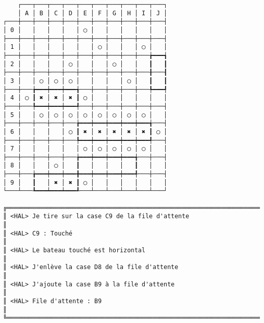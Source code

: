 {\scriptsize
\begin{verbatim}
    ┌───┬───┬───┬───┬───┬───┬───┬───┬───┬───┐
    │ A │ B │ C │ D │ E │ F │ G │ H │ I │ J │
┌───┼───┼───┼───┼───┼───┼───┼───┼───┼───┼───┤
│ 0 │   │   │   │   │ ◯ │   │   │   │   │   │
├───┼───┼───┼───┼───┼───┼───┼───┼───┼───┼───┤
│ 1 │   │   │   │   │   │ ◯ │   │   │ ◯ │   │
├───┼───┼───┼───┼───┼───┼───┼───┼───┼───╆━━━┪
│ 2 │   │   │   │ ◯ │   │   │ ◯ │   │   ┃   ┃
├───┼───┼───┼───┼───┼───┼───┼───┼───┼───╂───┨
│ 3 │   │ ◯ │ ◯ │ ◯ │   │   │   │ ◯ │   ┃   ┃
├───┼───╆━━━┿━━━┿━━━╅───┼───┼───┼───┼───╄━━━┩
│ 4 │ ◯ ┃ ✖ │ ✖ │ ✖ ┃ ◯ │   │   │   │   │   │
├───┼───╄━━━┿━━━┿━━━╃───┼───┼───┼───┼───┼───┤
│ 5 │   │ ◯ │ ◯ │ ◯ │ ◯ │ ◯ │ ◯ │ ◯ │ ◯ │   │
├───┼───┼───┼───┼───╆━━━┿━━━┿━━━┿━━━┿━━━╅───┤
│ 6 │   │   │   │ ◯ ┃ ✖ │ ✖ │ ✖ │ ✖ │ ✖ ┃ ◯ │
├───┼───┼───┼───┼───╄━━━┿━━━┿━━━┿━━━┿━━━╃───┤
│ 7 │   │   │   │   │ ◯ │ ◯ │ ◯ │ ◯ │ ◯ │   │
├───┼───┼───┼───┼───╆━━━┿━━━┿━━━┿━━━╅───┼───┤
│ 8 │   │   │ ◯ │   ┃   │   │   │   ┃   │   │
├───┼───╆━━━┿━━━┿━━━╋━━━┿━━━┿━━━┿━━━╃───┼───┤
│ 9 │   ┃   │ ✖ │ ✖ ┃ ◯ │   │   │   │   │   │
└───┴───┺━━━┷━━━┷━━━┹───┴───┴───┴───┴───┴───┘

╔══════════════════════════════════════════════════════════════════════════════════════════════════╗
║ <HAL> Je tire sur la case C9 de la file d'attente                                                ║
║ <HAL> C9 : Touché                                                                                ║
║ <HAL> Le bateau touché est horizontal                                                            ║
║ <HAL> J'enlève la case D8 de la file d'attente                                                   ║
║ <HAL> J'ajoute la case B9 à la file d'attente                                                    ║
║ <HAL> File d'attente : B9                                                                        ║
╚══════════════════════════════════════════════════════════════════════════════════════════════════╝
\end{verbatim}}
\newpage

